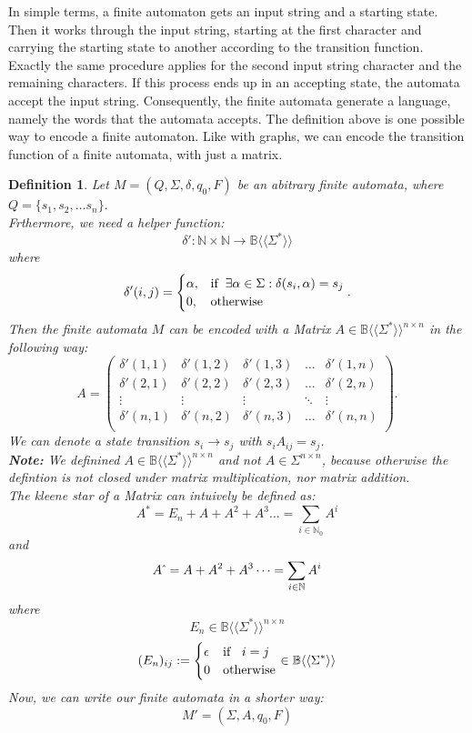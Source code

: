 \documentclass[12pt,letterpaper]{article}
\newtheorem{definition}{Definition}
\newcommand{\fps}[1] {
\mathbb{#1}\langle \langle \Sigma^* \rangle \rangle
}
\begin{document}
In simple terms, a finite automaton gets an input string and a starting  state. Then it works through the input string, starting at the first character and carrying the starting state to another according to the transition function.
Exactly the same procedure applies for the second input string character and the remaining characters. If this process ends up in an accepting state, the automata accept the input string. Consequently, the finite automata generate a language, namely the words that the automata 
accepts. The definition above is one possible way to encode a finite automaton. 
Like with graphs, we can encode the transition function of a finite
automata, with just a matrix.
\begin{definition}
  Let $M = (Q, \Sigma, \delta, q_0, F)$ be an abitrary finite 
  automata, where $Q = \{ s_1, s_2, \dots s_n\}.$ \\
  Frthermore, we need a helper function:
  \[
    \delta': \mathbb{N} \times \mathbb{N} \to \fps{B}
  \]
  where
  \[
    \delta'(i, j) = 
      \begin{cases}
        \alpha, & \text{if} \hspace{0.2cm} \exists \alpha \in \Sigma: 
          \delta(s_i, \alpha) = s_j \\
        0, & \text{otherwise}
      \end{cases}.
  \]
  Then the finite automata $M$ can be encoded with a Matrix
  $A \in \fps{B}^{n \times n}$
  in the following way:
  \[
    A = 
    \begin{pmatrix}
      \delta'(1,1)       & \delta'(1,2) & \delta'(1,3) & \dots & \delta'(1,n) \\
      \delta'(2,1)       & \delta'(2,2) & \delta'(2,3) & \dots & \delta'(2,n) \\
      \vdots             & \vdots       & \vdots       & \ddots& \vdots\\
      \delta'(n,1)       & \delta'(n,2) & \delta'(n,3) & \dots & \delta'(n,n) \\
    \end{pmatrix}
  .\]
  We can denote a state transition $s_i \to s_j$ with $s_iA_{ij} = s_j$.\\
  {\bf Note:} We definined $A \in \fps{B}^{n \times n}$ and not 
  $A \in \Sigma^{n \times n}$, because otherwise the defintion is not closed
  under matrix multiplication, nor matrix addition.
  \pagebreak\\
  The kleene star of a Matrix can intuively be defined as:
  \[
    A^* = E_n + A + A^2 + A^3 \dots  = \sum_{i \in \mathbb{N}_0} A^i
  \]
  and
  \[
    A\hat{\mkern6mu} = A + A^2 + A^3 \dots  = \sum_{i \in \mathbb{N}} A^i
  \]
  where
  \[ E_n \in \fps{B}^{n \times n}\]
  \[
    (E_n)_{ij} := 
    \begin{cases}
      \epsilon & \text{if } \hspace{0.2cm} i=j \\
      0        & \text{otherwise}
    \end{cases} \in \fps{B}
  \]
  Now, we can write our finite automata in a shorter way:
  \[
    M' = (\Sigma, A, q_0, F)
  \]
\end{definition}
\end{document}
